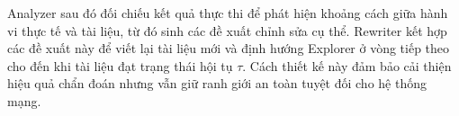 Analyzer sau đó đối chiếu kết quả thực thi để phát hiện khoảng cách giữa hành vi thực tế và tài liệu, từ đó sinh các đề xuất chỉnh sửa cụ thể. Rewriter kết hợp các đề xuất này để viết lại tài liệu mới và định hướng Explorer ở vòng tiếp theo cho đến khi tài liệu đạt trạng thái hội tụ $\tau$. Cách thiết kế này đảm bảo cải thiện hiệu quả chẩn đoán nhưng vẫn giữ ranh giới an toàn tuyệt đối cho hệ thống mạng.
